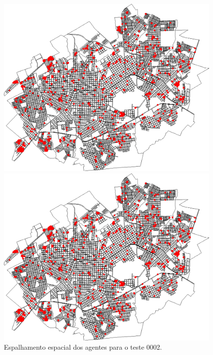 \begin{figure}[H]
\begin{minipage}{.5\textwidth}
    \captionsetup{labelformat=empty}
  \end{minipage}
  \begin{minipage}{.5\textwidth}
    \centering
    \includegraphics[width=1.0\textwidth]{Figuras/Resultados/0002/Saidas_GPU_BIT/MonteCarlo_0/Simulacao_0/Espacial/00160.png}
    \captionsetup{labelformat=empty}
  \end{minipage}%
  \begin{minipage}{.5\textwidth}
    \centering
    \includegraphics[width=1.0\textwidth]{Figuras/Resultados/0002/Saidas_GPU_BIT/MonteCarlo_0/Simulacao_0/Espacial/00200.png}
    \captionsetup{labelformat=empty}
  \end{minipage}
  \caption{Espalhamento espacial dos agentes para o teste 0002.}
  \label{fig:espacial_0002}
\end{figure}

